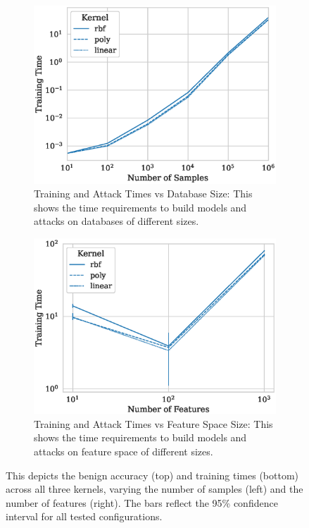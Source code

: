 \documentclass[fonts]{icst}
\begin{document}
\begin{figure}
\begin{subfigure}{.45\textwidth}
        \label{fig:features_acc}
    \end{subfigure}
    \hfill
    \begin{subfigure}{.45\textwidth}
        \centering
        \includegraphics[width=\textwidth]{./generated/train_time_vs_samples.eps}
        \caption{Training and Attack Times vs Database Size: This shows the time requirements to build models and attacks on databases of different sizes.
        }
        \label{fig:samples_time}
    \end{subfigure}
    \hfill
    \begin{subfigure}{.45\textwidth}
      \centering
        \includegraphics[width=\textwidth]{./generated/train_time_vs_features.eps}
        \caption{Training and Attack Times vs Feature Space Size: This shows the time requirements to build models and attacks on feature space of different sizes. 
        }
        \label{fig:features_time}
    \end{subfigure}
    \label{fig:model}
    \caption{This depicts the benign accuracy (top) and training times (bottom) across all three kernels, varying the number of samples (left) and the number of features (right). The bars reflect the 95\% confidence interval for all tested configurations.}
\end{figure}
\end{document}

